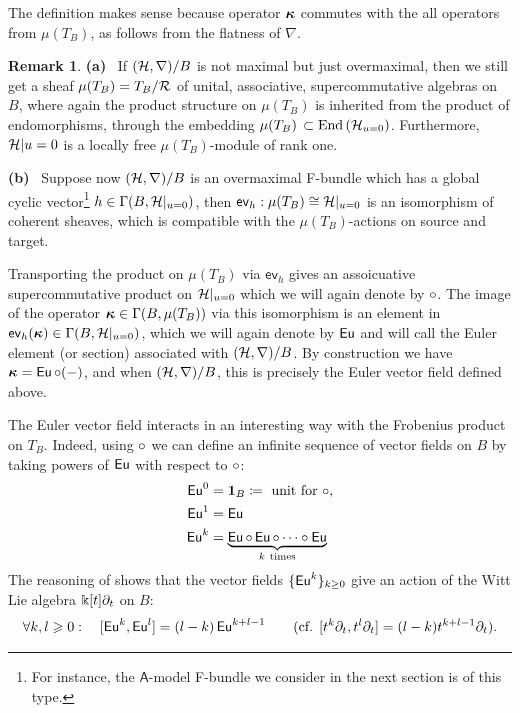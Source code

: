 \documentclass[twoside,leqno]{article}
\numberwithin{equation}{section}
\theoremstyle{plain}
\theoremstyle{definition}
\newtheorem{remark}[equation]{Remark}
\begin{document}
The definition makes sense because operator $\boldsymbol{\kappa}$ commutes with the all operators from $\mu(T_B)$, as follows from the flatness of $\nabla$.

\begin{remark} \label{rem-overmaxFqupEu} 
{\bfseries  (a)} \ If  $(\mathcal H,\nabla)/B$ is not maximal but just overmaximal, then we still get a sheaf $\mu(T_{B}) = T_{B}/\mathcal R$ of unital, associative, supercommutative algebras on $B$, where again the product structure on $\mu(T_{B})$ is inherited from the product of endomorphisms, through the embedding 
$\mu(T_{B}) \, \subset \operatorname{End}\left(\mathcal H_{u=0}\right)$. Furthermore,
$\mathcal H|{u=0}$ is a locally free $\mu(T_{B})$-module of rank one.

\smallskip

\noindent
{\bfseries (b)} \ Suppose now  $(\mathcal H,\nabla)/B$ is an overmaximal F-bundle which has a global cyclic vector\footnote{For instance,  the $\mathsf{A}$-model F-bundle we consider in the next section is of this type.} $h \in \Gamma(B,\mathcal H|_{u=0})$, then $\mathsf{ev}_{h} : \mu(T_{B}) \cong \mathcal H|_{u = 0}$  is an isomorphism of coherent sheaves,  which is compatible with the $\mu(T_{B})$-actions on source and target. 

\quad Transporting the product on $\mu(T_{B})$ via $\mathsf{ev}_{h}$ gives an assoicuative supercommutative product on $\mathcal H|_{u=0}$ which we will again denote by $\circ$.
The image of the operator $\boldsymbol{\kappa} \in \Gamma(B,\mu(T_{B}))$ via this isomorphism is an element
in $\mathsf{ev}_{h}(\boldsymbol{\kappa})  \in \Gamma(B,\mathcal H|_{u=0})$, which we will  again denote by $\operatorname{\mathsf{Eu}}$ and will call the Euler element (or section) associated with
$(\mathcal H,\nabla)/B$. By construction we have $\boldsymbol{\kappa} = \operatorname{\mathsf{Eu}}\circ(-)$, and when
$(\mathcal H,\nabla)/B$, this is precisely the Euler vector field defined above.
\end{remark}

The Euler vector field interacts in an interesting way with the
Frobenius product on $T_{B}$. Indeed, using $\circ$ we can define an
infinite sequence of vector fields on $B$ by taking powers of $\operatorname{\mathsf{Eu}}$
with respect to $\circ$:
\[
\begin{aligned}
  \Eu^0 & = \mathbf{1}_{B} \coloneqq \text{ unit for } \fp, \\
  \Eu^1 & = \Eu \\
  \Eu^{k} & = \underbrace{\Eu\fp \Eu\fp \cdots \fp\Eu}_{k \ \text{times}}
\end{aligned}
\]
The reasoning of \cite[Proposition~3.6.2,Theorem~5.6]{Manin_Frobenius_manifolds}
shows that the vector fields $\{ \operatorname{\mathsf{Eu}}^{k} \}_{k\geq 0}$ give an action of the Witt
Lie algebra $\Bbbk[t]\partial_t$ 
on $B$:
\[
\forall k,l \geqslant 0:\quad [\operatorname{\mathsf{Eu}}^k, \operatorname{\mathsf{Eu}}^l]= (l-k)\operatorname{\mathsf{Eu}}^{k+l-1} \qquad
(\text{cf. }[t^k\partial_t,t^l\partial_t]=(l-k) t^{k+l-1}\partial_t ).
\]
\end{document}

